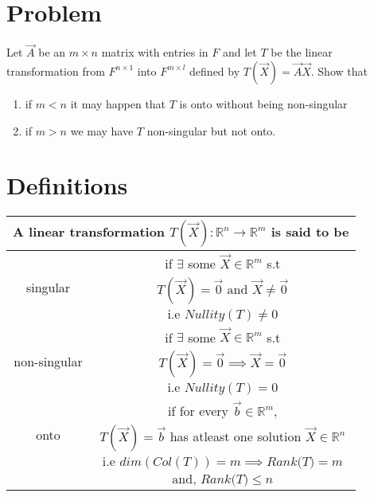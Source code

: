 \documentclass[journal,12pt,twocolumn]{IEEEtran}
\newcommand\myemptypage{
    \null
    \thispagestyle{empty}
    \addtocounter{page}{-1}
    \newpage
    }
\begin{document}
\section{Problem}
Let $\vec{A}$ be an $m \times n$ matrix with entries in $F$ and let $T$ be the linear transformation from $F^{n \times1 }$ into $F^{m \times l}$ defined by $T(\vec{X}) = \vec{A}\vec{X}$. Show that 
\begin{enumerate}
\item
if $m < n$ it may happen that $T$ is onto without being non-singular
\item
if $m>n$ we may have $T$ non-singular but not onto.
\\
\end{enumerate}

\section{Definitions}
\begin{table}[hp]
	\begin{center}
		\begin{tabular}{|c|c|}
			\hline
			\multicolumn{2}{|c|}{A linear transformation $T(\vec{X}) : \mathbb{R}^{n} \rightarrow \mathbb{R}^{m}$ is said to be}\\
			\hline
			\multirow{3}{*}{singular} & if $\exists$ some $\vec{X} \in \mathbb{R}^m$ s.t\\
			& \vbox{\begin{equation} \nonumber T(\vec{X}) = \vec{0} \text{ and } \vec{X} \neq \vec{0}\end{equation}}\\
			& \vbox{\begin{equation} \nonumber \text{i.e } Nullity(T) \neq 0 \end{equation}}\\
			\hline
			\multirow{3}{*}{non-singular} & if $\exists$ some $\vec{X} \in \mathbb{R}^m$ s.t\\
			& \vbox{\begin{equation} \nonumber T(\vec{X}) = \vec{0} \implies \vec{X} = \vec{0}\end{equation}}\\
			& \vbox{\begin{equation} \nonumber \text{i.e } Nullity(T) = 0 \end{equation}}\\
			\hline			
			\multirow{3}{*}{onto} & if for every  $\vec{b} \in \mathbb{R}^{m}$,\\
			& $T(\vec{X})=\vec{b}$ has atleast one solution $\vec{X} \in \mathbb{R}^{n}$\\
			& \vbox{\begin{equation} \nonumber \text{i.e } dim(Col(T)) = m \implies\textit{Rank(T)} = m \end{equation}}\\
			& \vbox{\begin{equation} \nonumber \text{and, } \textit{Rank(T)} \leq n \end{equation}}\\
			\hline
		\end{tabular}
	\end{center}
\end{table}
\pagebreak
\myemptypage
\end{document}
